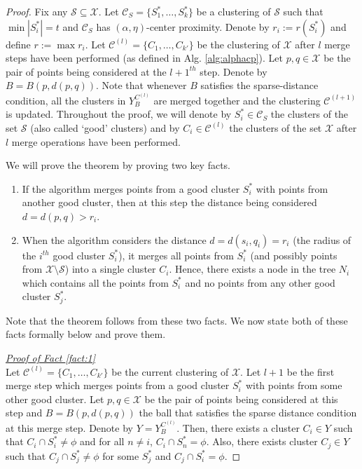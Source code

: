 \documentclass[11pt]{article}
\newcommand{\mc}{\mathcal}
\begin{document}
\begin{proof}
Fix any $\mc S \subseteq \mc X$. Let $\mc C_S = \{S_1^*, \ldots, S_k^*\}$ be a clustering of $\mc S$ such that $\min |S_i^*| = t$ and $\mc C_S$ has $(\alpha, \eta)$-center proximity. Denote by $r_i := r(S_i^*)$ and define $r := \max r_i$. Let $\mc C^{(l)} = \{C_1, \ldots, C_{k'}\}$ be the clustering of $\mc X$ after $l$ merge steps have been performed (as defined in Alg. \ref{alg:alphacp}). Let $p, q \in \mc X$ be the pair of points being considered at the $l+1^{th}$ step. Denote by $B = B(p, d(p, q))$. Note that whenever $B$ satisfies the sparse-distance condition, all the clusters in $Y_{B}^{C^{(l)}}$ are merged together and the clustering $\mc C^{(l+1)}$ is updated. Throughout the proof, we will denote by $S_i^* \in \mc C_S$ the clusters of the set $\mc S$ (also called `good' clusters) and by $C_i \in \mc C^{(l)}$ the clusters of the set $\mc X$ after $l$ merge operations have been performed.

\noindent We will prove the theorem by proving two key facts. %

\begin{enumerate}[nolistsep, noitemsep, label=\textbf{F.\arabic*}]
\renewcommand\labelitemi{$\diamond$}
\item \label{fact:1} If the algorithm merges points from a good cluster $S_i^*$ with points from another good cluster, then at this step the distance being considered $d = d(p,q) > r_i$.	
\item \label{fact:2} When the algorithm considers the distance $d = d(s_i, q_i) = r_i$ (the radius of the $i^{th}$ good cluster $S_i^*$), it merges all points from $S_i^*$ (and possibly points from $\mc X\setminus \mc S$) into a single cluster $C_i$. Hence, there exists a node in the tree $N_i$ which contains all the points from $S_i^*$ and no points from any other good cluster $S_j^*$. 	
\end{enumerate}
Note that the theorem follows from these two facts. We now state both of these facts formally below and prove them.

\noindent\textit{\underline{Proof of Fact \ref{fact:1} %
}}\\
Let $\mc C^{(l)} = \{C_1, \ldots, C_{k'}\}$ be the current clustering of $\mc X$. Let $l+1$ be the first merge step which merges points from a good cluster $S_i^*$ with points from some other good cluster. Let $p, q \in \mc X$ be the pair of points being considered at this step and $B = B(p, d(p, q))$ the ball that satisfies the sparse distance condition at this merge step. Denote by $Y = Y_{B}^{C^{(l)}}$. Then, there exists a cluster $C_i \in Y$ such that $C_i\cap S_i^*  \neq \phi$ and for all $n \neq i$, $C_i \cap S_n^* = \phi$. Also, there exists cluster $C_j \in Y$ such that $C_j \cap S_j^* \neq \phi$ for some $S_j^*$ and $C_j \cap S_i^* = \phi$.


\end{proof}
\end{document}
